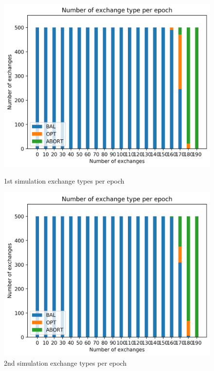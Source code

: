 \documentclass[mscthesis]{usiinfthesis}
\begin{document}
\begin{figure}[!htb]
   \begin{minipage}{0.49\textwidth}
     \centering
     \includegraphics[width=\linewidth]{images/1/1-exchanges-type-epoch}
  	\caption{1st simulation exchange types per epoch}
  	\label{fig:sim-one-duplicates}
   \end{minipage}\hfill
   \begin{minipage}{0.49\textwidth}
     \centering
     \includegraphics[width=\linewidth]{images/2/2-exchanges-type-epoch.png}
       \caption{2nd simulation exchange types per epoch }
 		\label{fig:sim-two-duplicates}
   \end{minipage}
\end{figure}
\end{document}
